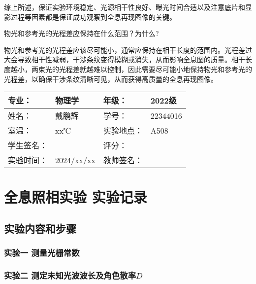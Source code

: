 \documentclass[dvipsnames, svgnames,a4paper,11pt]{article}
\begin{document}
		综上所述，保证实验环境稳定、光源相干性良好、曝光时间合适以及注意底片和显影过程等因素都是保证成功观察到全息再现图像的关键。
		
		
		
		

	\begin{question}
		物光和参考光的光程差应保持在什么范围？为什么?
	\end{question}
		
	物光和参考光的光程差应该尽可能小，通常应保持在相干长度的范围内。光程差过大会导致相干性减弱，干涉条纹变得模糊或消失，从而影响全息图的质量。相干长度越小，两束光的光程差就越难以控制，因此需要尽可能小地保持物光和参考光的光程差，以确保干涉条纹清晰可见，从而获得高质量的全息再现图像。

\clearpage
\begin{table}
	\renewcommand\arraystretch{1.7}
	\centering
	\begin{tabularx}{\textwidth}{|X|X|X|X|}
	\hline
	专业：& 物理学 &年级：& 2022级 \\
	\hline
	姓名：& 戴鹏辉 & 学号：& 22344016 \\
	\hline
	室温：& xx℃ & 实验地点： & A508 \\
	\hline
	学生签名：& & 评分： &\\
	\hline
	实验时间：& 2024/xx/xx & 教师签名：&\\
	\hline
	\end{tabularx}
\end{table}

\section{全息照相实验 \quad\heiti 实验记录}
\subsection{实验内容和步骤}

	\subsubsection{实验一 测量光栅常数}
	
	
	\subsubsection{实验二 测定未知光波波长及角色散率$D$}

		

\end{document}
